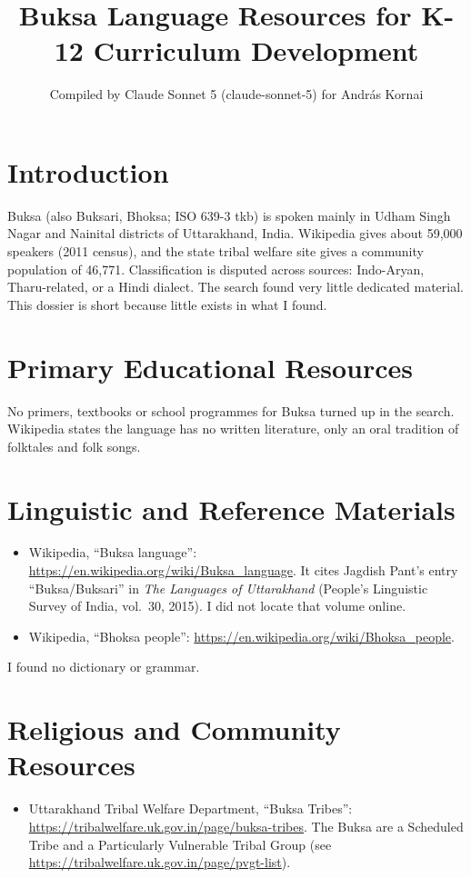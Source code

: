 \documentclass[12pt]{article}
\title{Buksa Language Resources for K-12 Curriculum Development}
\author{Compiled by Claude Sonnet 5 (claude-sonnet-5) for Andr\'as Kornai}
\date{}
\begin{document}
\maketitle

\section{Introduction}
Buksa (also Buksari, Bhoksa; ISO 639-3 tkb) is spoken mainly in Udham Singh Nagar and Nainital districts of Uttarakhand, India. Wikipedia gives about 59,000 speakers (2011 census), and the state tribal welfare site gives a community population of 46,771. Classification is disputed across sources: Indo-Aryan, Tharu-related, or a Hindi dialect. The search found very little dedicated material. This dossier is short because little exists in what I found.

\section{Primary Educational Resources}
No primers, textbooks or school programmes for Buksa turned up in the search. Wikipedia states the language has no written literature, only an oral tradition of folktales and folk songs.

\section{Linguistic and Reference Materials}
\begin{itemize}
\item Wikipedia, ``Buksa language'': \url{https://en.wikipedia.org/wiki/Buksa_language}. It cites Jagdish Pant's entry ``Buksa/Buksari'' in \emph{The Languages of Uttarakhand} (People's Linguistic Survey of India, vol.\ 30, 2015). I did not locate that volume online.
\item Wikipedia, ``Bhoksa people'': \url{https://en.wikipedia.org/wiki/Bhoksa_people}.
\end{itemize}
I found no dictionary or grammar.

\section{Religious and Community Resources}
\begin{itemize}
\item Uttarakhand Tribal Welfare Department, ``Buksa Tribes'': \url{https://tribalwelfare.uk.gov.in/page/buksa-tribes}. The Buksa are a Scheduled Tribe and a Particularly Vulnerable Tribal Group (see \url{https://tribalwelfare.uk.gov.in/page/pvgt-list}).
\end{itemize}
\end{document}
